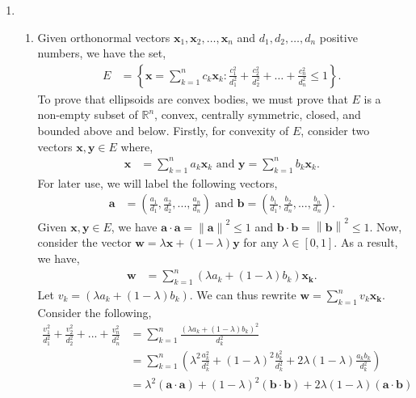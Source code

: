 \documentclass[a4paper,11pt]{article}
\newcommand{\norm}[1]{\left\lVert#1\right\rVert}
\newcommand{\ds}{\displaystyle}
\begin{document}
{{\begin{enumerate}[leftmargin=*]
		\item 
			\begin{enumerate}
				\item Given orthonormal vectors $\ds{\bm{x}_1, \bm{x}_2,\dots, \bm{x}_n}$ and $\ds{d_1, d_2, \dots , d_n}$ positive numbers, we have the set,
					\begin{align*}
						E & = \left\{ \bm{x} = \sum_{k = 1}^n c_k \bm{x}_k : \frac{c_1^2}{d_1^2} + \frac{c_2^2}{d_2^2} + \dots + \frac{c_n^2}{d_n^2} \leq 1 \right\}.
					\end{align*}
					To prove that ellipsoids are convex bodies, we must prove that $\ds{E}$ is a non-empty subset of $\ds{\mathbb{R}^n}$, convex, centrally symmetric, closed, and bounded above and below. Firstly, for convexity of $\ds{E}$, consider two vectors $\ds{\bm{x}, \bm{y} \in E}$ where,
					\begin{align*}
						\bm{x} & = \sum_{k = 1}^n a_k \bm{x}_k \text{ and } \bm{y} = \sum_{k = 1}^n b_k \bm{x}_k.
					\end{align*}
					For later use, we will label the following vectors,
					\begin{align*}
						\bm{a} & = \left(\frac{a_1}{d_1}, \frac{a_2}{d_2}, ... , \frac{a_n}{d_n}\right) \text{ and } \bm{b} = \left(\frac{b_1}{d_1}, \frac{b_2}{d_n}, ... , \frac{b_n}{d_n}\right).
					\end{align*}
					Given $\ds{\bm{x}, \bm{y} \in E}$, we have $\ds{\bm{a} \cdot \bm{a} = \norm{\bm{a}}^2 \leq 1}$ and $\ds{\bm{b} \cdot \bm{b} = \norm{\bm{b}}^2 \leq 1.}$
					Now, consider the vector $\ds{\bm{w} = \lambda \bm{x} + (1 - \lambda) \bm{y}}$ for any $\ds{\lambda \in [0,1]}$. As a result, we have,
					\begin{align*}
						\bm{w} & = \sum_{k = 1}^n (\lambda a_k + (1 - \lambda) b_k)\bm{x_k}.
					\end{align*}
					Let $\ds{v_k = (\lambda a_k + (1 - \lambda) b_k)}$. We can thus rewrite $\ds{\bm{w} = \sum_{k = 1}^n v_k\bm{x_k}}$. Consider the following,
					\begin{align*}
						\frac{v_1^2}{d_1^2} + \frac{v_2^2}{d_2^2} + ... + \frac{v_n^2}{d_n^2} & = \sum_{k = 1}^n \frac{(\lambda a_k + (1 - \lambda) b_k)^2}{d_k^2} \\
			& = \sum_{k = 1}^n \left(\lambda^2 \frac{a_k^2}{d_k^2} + (1 - \lambda)^2 \frac{b_k^2}{d_k^2} + 2\lambda(1 - \lambda) \frac{a_kb_k}{d_k^2}\right) \\
			& = \lambda^2 (\bm{a} \cdot \bm{a}) + (1 - \lambda)^2 (\bm{b} \cdot \bm{b}) + 2\lambda(1 - \lambda) (\bm{a} \cdot \bm{b}) \\

\end{align*}
\end{enumerate}
\end{enumerate}}}
\end{document}
